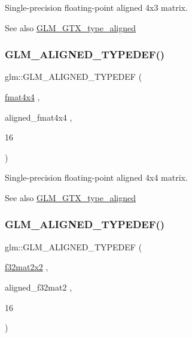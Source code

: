 Single-\/precision floating-\/point aligned 4x3 matrix. \begin{DoxySeeAlso}{See also}
\mbox{\hyperlink{group__gtx__type__aligned}{G\+L\+M\+\_\+\+G\+T\+X\+\_\+type\+\_\+aligned}} 
\end{DoxySeeAlso}
\mbox{\label{group__gtx__type__aligned_ga07c75cd04ba42dc37fa3e105f89455c5}} 
\subsubsection{\texorpdfstring{GLM\_ALIGNED\_TYPEDEF()}{GLM\_ALIGNED\_TYPEDEF()}\hspace{0.1cm}{\footnotesize\ttfamily [180/209]}}
{\footnotesize\ttfamily glm\+::\+G\+L\+M\+\_\+\+A\+L\+I\+G\+N\+E\+D\+\_\+\+T\+Y\+P\+E\+D\+EF (\begin{DoxyParamCaption}\item[{\mbox{\hyperlink{group__gtc__type__precision_ga16b508b75c7213ba6b24055ff3b7503d}{fmat4x4}}}]{,  }\item[{aligned\+\_\+fmat4x4}]{,  }\item[{16}]{ }\end{DoxyParamCaption})}

Single-\/precision floating-\/point aligned 4x4 matrix. \begin{DoxySeeAlso}{See also}
\mbox{\hyperlink{group__gtx__type__aligned}{G\+L\+M\+\_\+\+G\+T\+X\+\_\+type\+\_\+aligned}} 
\end{DoxySeeAlso}
\mbox{\label{group__gtx__type__aligned_ga65ff0d690a34a4d7f46f9b2eb51525ee}} 
\subsubsection{\texorpdfstring{GLM\_ALIGNED\_TYPEDEF()}{GLM\_ALIGNED\_TYPEDEF()}\hspace{0.1cm}{\footnotesize\ttfamily [181/209]}}
{\footnotesize\ttfamily glm\+::\+G\+L\+M\+\_\+\+A\+L\+I\+G\+N\+E\+D\+\_\+\+T\+Y\+P\+E\+D\+EF (\begin{DoxyParamCaption}\item[{\mbox{\hyperlink{group__gtc__type__precision_gae7ebbb68656a5fd879d536b5d8452fb1}{f32mat2x2}}}]{,  }\item[{aligned\+\_\+f32mat2}]{,  }\item[{16}]{ }\end{DoxyParamCaption})}

